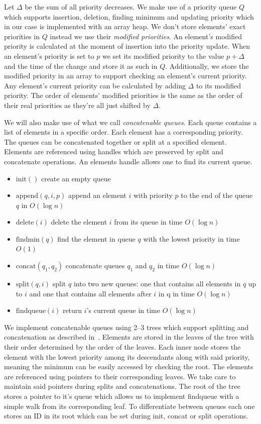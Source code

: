 Let $\Delta$ be the sum of all priority decreases. We make use of a priority queue $Q$ which supports insertion, deletion, finding minimum and updating priority which in our case is implemented with an array heap. We don't store elements' exact priorities in $Q$ instead we use their \textit{modified priorities}. An element's modified priority is calculated at the moment of insertion into the priority update. When an element's priority is set to $p$ we set its modified priority to the value $p + \Delta$ and the time of the change and store it as such in $Q$. Additionally, we store the modified priority in an array to support checking an element's current priority. Any element's current priority can be calculated by adding $\Delta$ to its modified priority. The order of elements' modified priorities is the same as the order of their real priorities as they're all just shifted by $\Delta$.

We will also make use of what we call \textit{concatenable queues}. Each queue contains a list of elements in a specific order. Each element has a corresponding priority. The queues can be concatenated together or split at a specified element. Elements are referenced using handles which are preserved by split and concatenate operations. An elements handle allows one to find its current queue.

\begin{itemize}
    \item $\text{init}()$ create an empty queue
    \item $\text{append}(q, i, p)$ append an element $i$ with priority $p$ to the end of the queue $q$ in $O(\log n)$
    \item $\text{delete}(i)$ delete the element $i$ from its queue in time $O(\log n)$
    \item $\text{findmin}(q)$ find the element in queue $q$ with the lowest priority in time $O(1)$
    \item $\text{concat}(q_1, q_2)$ concatenate queues $q_1$ and $q_2$ in time $O(\log n)$
    \item $\text{split}(q, i)$ split $q$ into two new queues: one that contains all elements in $q$ up to $i$ and one that contains all elements after $i$ in q in time $O(\log n)$
    \item $\text{findqueue}(i)$ return $i$'s current queue in time $O(\log n)$
\end{itemize}

We implement concatenable queues using 2–3 trees which support splitting and concatenation as described in~\cite{aho1974design}. Elements are stored in the leaves of the tree with their order determined by the order of the leaves. Each inner node stores the element with the lowest priority among its descendants along with said priority, meaning the minimum can be easily accessed by checking the root. The elements are referenced using pointers to their corresponding leaves. We take care to maintain said pointers during splits and concatenations. The root of the tree stores a pointer to it's queue which allows us to implement findqueue with a simple walk from its corresponding leaf. To differentiate between queues each one stores an ID in its root which can be set during init, concat or split operations. 

